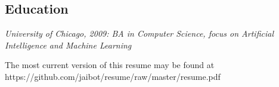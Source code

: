 \documentclass[line]{res} %
\begin{document}
\begin{resume}

\section{Education}

{\sl University of Chicago, 2009: BA in Computer Science, focus on Artificial Intelligence and Machine Learning}
 
\hspace{-10mm}
The most current version of this resume may be found at https://github.com/jaibot/resume/raw/master/resume.pdf
\end{resume}
\end{document}

